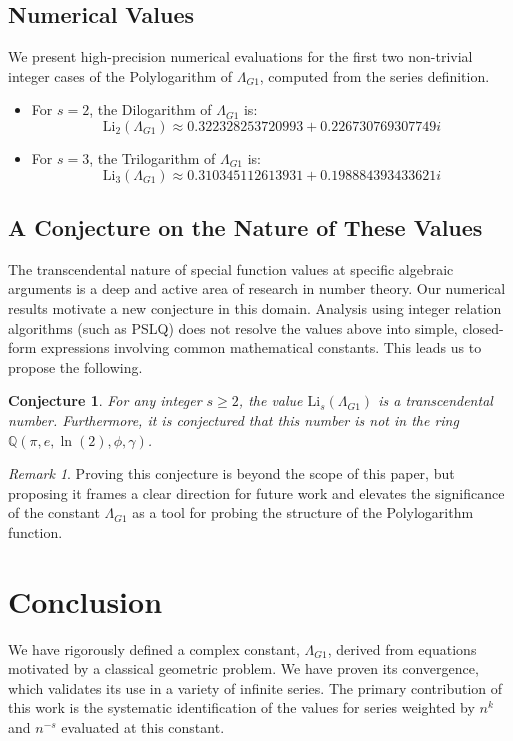 \documentclass{amsart}
\theoremstyle{plain}
\newtheorem{conjecture}[theorem]{Conjecture}
\theoremstyle{definition}
\theoremstyle{remark}
\newtheorem*{remark}{Remark}
\newcommand{\LambdaG}{\Lambda_{G1}}
\begin{document}
\subsection{Numerical Values}
We present high-precision numerical evaluations for the first two non-trivial integer cases of the Polylogarithm of $\LambdaG$, computed from the series definition.
\begin{itemize}
    \item For $s=2$, the Dilogarithm of $\LambdaG$ is:
    $$ \mathrm{Li}_2(\LambdaG) \approx 0.322328253720993 + 0.226730769307749i $$
    \item For $s=3$, the Trilogarithm of $\LambdaG$ is:
    $$ \mathrm{Li}_3(\LambdaG) \approx 0.310345112613931 + 0.198884393433621i $$
\end{itemize}

\subsection{A Conjecture on the Nature of These Values}
The transcendental nature of special function values at specific algebraic arguments is a deep and active area of research in number theory. Our numerical results motivate a new conjecture in this domain. Analysis using integer relation algorithms (such as PSLQ) does not resolve the values above into simple, closed-form expressions involving common mathematical constants. This leads us to propose the following.

\begin{conjecture}
For any integer $s \ge 2$, the value $\mathrm{Li}_s(\LambdaG)$ is a transcendental number. Furthermore, it is conjectured that this number is not in the ring $\mathbb{Q}(\pi, e, \ln(2), \phi, \gamma)$.
\end{conjecture}
\begin{remark}
Proving this conjecture is beyond the scope of this paper, but proposing it frames a clear direction for future work and elevates the significance of the constant $\LambdaG$ as a tool for probing the structure of the Polylogarithm function.
\end{remark}

\section{Conclusion}
We have rigorously defined a complex constant, $\LambdaG$, derived from equations motivated by a classical geometric problem. We have proven its convergence, which validates its use in a variety of infinite series. The primary contribution of this work is the systematic identification of the values for series weighted by $n^k$ and $n^{-s}$ evaluated at this constant.
\end{document}

